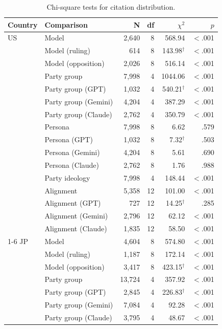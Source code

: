 \begin{table}[t]
\centering
\footnotesize
\setlength{\tabcolsep}{3pt}
\caption{Chi-square tests for citation distribution.}
\label{tab:citation-tests}
\begin{tabular}{llrrrr}
\toprule
\textbf{Country} & \textbf{Comparison} & \textbf{N} & \textbf{df} & \textbf{$\chi^2$} & \textbf{$p$} \\
\midrule
US & Model & 2{,}640 & 8 & 568.94 & $<$.001 \\
 & Model (ruling) & 614 & 8 & 143.98$^\dagger$ & $<$.001 \\
 & Model (opposition) & 2{,}026 & 8 & 516.14 & $<$.001 \\
 & Party group & 7{,}998 & 4 & 1044.06 & $<$.001 \\
 & Party group (GPT) & 1{,}032 & 4 & 540.21$^\dagger$ & $<$.001 \\
 & Party group (Gemini) & 4{,}204 & 4 & 387.29 & $<$.001 \\
 & Party group (Claude) & 2{,}762 & 4 & 350.79 & $<$.001 \\
 & Persona & 7{,}998 & 8 & 6.62 & .579 \\
 & Persona (GPT) & 1{,}032 & 8 & 7.32$^\dagger$ & .503 \\
 & Persona (Gemini) & 4{,}204 & 8 & 5.61 & .690 \\
 & Persona (Claude) & 2{,}762 & 8 & 1.76 & .988 \\
 & Party ideology & 7{,}998 & 4 & 148.44 & $<$.001 \\
 & Alignment & 5{,}358 & 12 & 101.00 & $<$.001 \\
 & Alignment (GPT) & 727 & 12 & 14.25$^\dagger$ & .285 \\
 & Alignment (Gemini) & 2{,}796 & 12 & 62.12 & $<$.001 \\
 & Alignment (Claude) & 1{,}835 & 12 & 58.50 & $<$.001 \\
\cmidrule(lr){1-6}
JP & Model & 4{,}604 & 8 & 574.80 & $<$.001 \\
 & Model (ruling) & 1{,}187 & 8 & 172.14 & $<$.001 \\
 & Model (opposition) & 3{,}417 & 8 & 423.15$^\dagger$ & $<$.001 \\
 & Party group & 13{,}724 & 4 & 357.92 & $<$.001 \\
 & Party group (GPT) & 2{,}845 & 4 & 226.83$^\dagger$ & $<$.001 \\
 & Party group (Gemini) & 7{,}084 & 4 & 92.28 & $<$.001 \\
 & Party group (Claude) & 3{,}795 & 4 & 48.67 & $<$.001 \\

\end{tabular}
\end{table}
